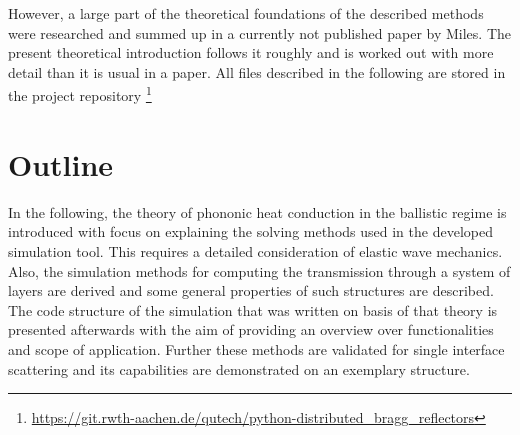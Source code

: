 However, a large part of the theoretical foundations of the described methods
were researched and summed up in a currently not published paper by Miles. The
present theoretical introduction follows it roughly and is worked out with more
detail than it is usual in a paper. All files described in the following are
stored in the project repository 
\footnote{\url{https://git.rwth-aachen.de/qutech/python-distributed_bragg_reflectors}}

\section{Outline}
In the following, the theory of phononic heat conduction in the ballistic
regime is introduced with focus on explaining the solving methods used in the
developed simulation tool. This requires a detailed consideration of elastic
wave mechanics. Also, the simulation methods for computing the transmission
through a system of layers are derived and some general properties of such
structures are described.
The code structure of the simulation that was written on basis of
that theory is presented afterwards with the aim of providing an overview over
functionalities and scope of application. Further these methods are validated
for single interface scattering and its capabilities are demonstrated on an
exemplary structure.